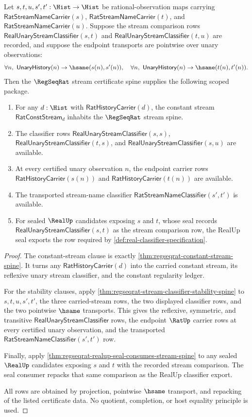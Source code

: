 \begin{theorem}
\label{thm:regseqrat-stream-spine-scoped-package}
Let $s,t,u,s',t':\Hist\to\Hist$ be rational-observation maps carrying
$\mathsf{RatStreamNameCarrier}(s)$, $\mathsf{RatStreamNameCarrier}(t)$, and
$\mathsf{RatStreamNameCarrier}(u)$. Suppose the stream comparison rows
$\mathsf{RealUnaryStreamClassifier}(s,t)$ and
$\mathsf{RealUnaryStreamClassifier}(t,u)$ are recorded, and suppose the endpoint
transports are pointwise over unary observations:
$$
\forall n,\ \mathsf{UnaryHistory}(n)\to\hsame(s(n),s'(n)),
\quad
\forall n,\ \mathsf{UnaryHistory}(n)\to\hsame(t(n),t'(n)).
$$
Then the $\RegSeqRat$ stream certificate spine supplies the following scoped
package.
\begin{enumerate}
  \item For any $d:\Hist$ with $\mathsf{RatHistoryCarrier}(d)$, the constant
  stream $\mathsf{RatConstStream}_d$ inhabits the $\RegSeqRat$ stream spine.
  \item The classifier rows
  $\mathsf{RealUnaryStreamClassifier}(s,s)$,
  $\mathsf{RealUnaryStreamClassifier}(t,s)$, and
  $\mathsf{RealUnaryStreamClassifier}(s,u)$ are available.
  \item At every certified unary observation $n$, the endpoint carrier rows
  $\mathsf{RatHistoryCarrier}(s(n))$ and
  $\mathsf{RatHistoryCarrier}(t(n))$ are available.
  \item The transported stream-name classifier
  $\mathsf{RatStreamNameClassifier}(s',t')$ is available.
  \item For sealed $\RealUp$ candidates exposing $s$ and $t$, whose seal records
  $\mathsf{RealUnaryStreamClassifier}(s,t)$ as the stream comparison row, the
  RealUp seal exports the row required by
  \autoref{def:real-classifier-specification}.
\end{enumerate}
\end{theorem}
\begin{proof}
The constant-stream clause is exactly
\autoref{thm:regseqrat-constant-stream-spine}. It turns any
$\mathsf{RatHistoryCarrier}(d)$ into the carried constant stream, its reflexive
unary stream classifier, and the constant regularity ledger.

For the stability clauses, apply
\autoref{thm:regseqrat-stream-classifier-stability-spine} to $s,t,u,s',t'$,
the three carried-stream rows, the two displayed classifier rows, and the two
pointwise $\hsame$ transports. This gives the reflexive, symmetric, and
transitive $\mathsf{RealUnaryStreamClassifier}$ rows, the endpoint
$\RatUp$ carrier rows at every certified unary observation, and the transported
$\mathsf{RatStreamNameClassifier}(s',t')$ row.

Finally, apply
\autoref{thm:regseqrat-realup-seal-consumes-stream-spine} to any sealed
$\RealUp$ candidates exposing $s$ and $t$ with the recorded stream comparison.
The seal consumer repacks that same comparison as the RealUp classifier export.

All rows are obtained by projection, pointwise $\hsame$ transport, and repacking
of the listed certificate data. No quotient, completion, or host equality
principle is used.
\end{proof}

